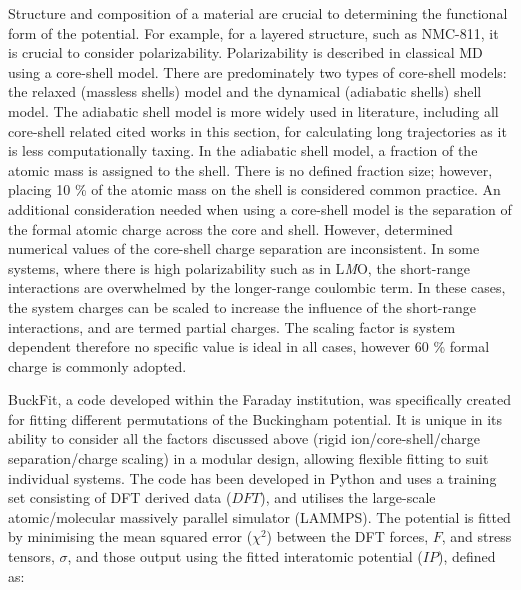 \documentclass[../main.tex]{subfiles}
\begin{document}
Structure and composition of a material are crucial to determining the functional form of the potential. For example, for a layered structure, such as NMC-811, it is crucial to consider polarizability. Polarizability is described in classical MD using a core-shell model. There are predominately two types of core-shell models: the relaxed (massless shells) model \cite{Lindan_1993} and the dynamical (adiabatic shells) shell model. \cite{Mitchell_1993} The adiabatic shell model is more widely used in literature, including all core-shell related cited works in this section,\cite{Hart1998, Fisher2010, Lewis_1985,Ammundsen1999, Kerisit2014, He2019,lee2012atomistic} for calculating long trajectories as it is less computationally taxing. In the adiabatic shell model, a fraction of the atomic mass is assigned to the shell. There is no defined fraction size; however, placing 10 \% of the atomic mass on the shell is considered common practice. \cite{PLIMPTON19951,todorov2006dl_poly_3} An additional consideration needed when using a core-shell model is the separation of the formal atomic charge across the core and shell. However, determined numerical values of the core-shell charge separation are inconsistent. \cite{wang2014molecular,escribano2017enhancing, lee2012atomistic,Lee2013_lithium,dai2019comparison} In some systems, where there is high polarizability such as in L\textit{M}O, the short-range interactions are overwhelmed by the longer-range coulombic term. In these cases, the system charges can be scaled to increase the influence of the short-range interactions, and are termed partial charges. The scaling factor is system dependent therefore no specific value is ideal in all cases, however 60 \% formal charge is commonly adopted. \cite{pedone2006potentials}

BuckFit, \cite{Morgan2020BuckFit} a code developed within the Faraday institution, was specifically created for fitting different permutations of the Buckingham potential. It is unique in its ability to consider all the factors discussed above (rigid ion/core-shell/charge separation/charge scaling) in a modular design, allowing flexible fitting to suit individual systems. The code has been developed in Python and uses a training set consisting of DFT derived data ($DFT$), and utilises the large-scale atomic/molecular massively parallel simulator (LAMMPS). \cite{PLIMPTON19951} The potential is fitted by minimising the mean squared error ($\chi^2$) between the DFT forces, $F$, and stress tensors, $\sigma$,  and those output using the fitted interatomic potential ($IP$), defined as:
\end{document}
